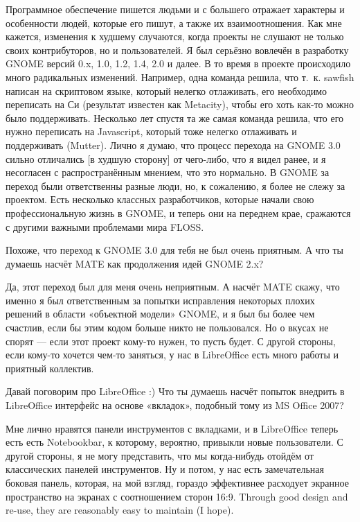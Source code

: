 \documentclass[10pt, a5paper]{article}
\begin{document}
\begin{Parallel}[p]{}{}
{\a Программное обеспечение пишется людьми и с большего отражает характеры и особенности людей, которые его пишут, а также их взаимоотношения. Как мне кажется, изменения к худшему случаются, когда проекты не слушают не только своих контрибуторов, но и пользователей. Я был серьёзно вовлечён в разработку GNOME версий 0.x, 1.0, 1.2, 1.4, 2.0 и далее. В то время в проекте происходило много радикальных изменений. Например, одна команда решила, что т.~к. sawfish написан на скриптовом языке, который нелегко отлаживать, его необходимо переписать на Си (результат известен как Metacity), чтобы его хоть как-то можно было поддерживать. Несколько лет спустя та же самая команда решила, что его нужно переписать на Javascript, который тоже нелегко отлаживать и поддерживать (Mutter). Лично я думаю, что процесс перехода на GNOME 3.0 сильно отличались [в худшую сторону] от чего-либо, что я видел ранее, и я несогласен с распространённым мнением, что это нормально. В GNOME за переход были ответственны разные люди, но, к сожалению, я более не слежу за проектом. Есть несколько классных разработчиков, которые начали свою профессиональную жизнь в GNOME, и теперь они на переднем крае, сражаются с другими важными проблемами мира FLOSS.

\q Похоже, что переход к GNOME 3.0 для тебя не был очень приятным. А что ты думаешь насчёт MATE как продолжения идей GNOME 2.x?

\a Да, этот переход был для меня очень неприятным. А насчёт MATE скажу, что именно я был ответственным за попытки исправления некоторых плохих решений в области «объектной модели» GNOME, и я был бы более чем счастлив, если бы этим кодом больше никто не пользовался. Но о вкусах не спорят — если этот проект кому-то нужен, то пусть будет. С другой стороны, если кому-то хочется чем-то заняться, у нас в LibreOffice есть много работы и приятный коллектив.

\q Давай поговорим про LibreOffice :) Что ты думаешь насчёт попыток внедрить в LibreOffice интерфейс на основе «вкладок», подобный тому из MS Office 2007?

\a Мне лично нравятся панели инструментов с вкладками, и в LibreOffice теперь есть есть Notebookbar, к которому, вероятно, привыкли новые пользователи. С другой стороны, я не могу представить, что мы когда-нибудь отойдём от классических панелей инструментов. Ну и потом, у нас есть замечательная боковая панель, которая, на мой взгляд, гораздо эффективнее расходует экранное пространство на экранах с соотношением сторон 16:9. Through good design and re-use, they are reasonably easy to maintain (I hope).

}
\end{Parallel}
\end{document}
